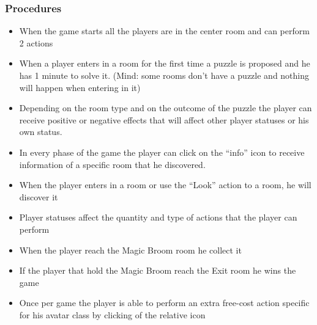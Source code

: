 \subsubsection{Procedures}
\begin{itemize}
\item When the game starts all the players are in the center room and can perform 2 actions
\item  When a player enters in a room for the first time a puzzle is proposed and he has 1 minute to solve it. (Mind: some rooms don’t have a puzzle and nothing will happen when entering in it)
\item  Depending on the room type and on the outcome of the puzzle the player can receive positive or negative effects that will affect other player statuses or his own status.
\item In every phase of the game the player can click on the “info” icon to receive information of a specific room that he discovered.
\item When the player enters in a room or use the “Look” action to a room, he will discover it
\item Player statuses affect the quantity and type of actions that the player can perform
\item When the player reach the Magic Broom room he collect it
\item If the player that hold the Magic Broom reach the Exit room he wins the game
\item Once per game the player is able to perform an extra free-cost action specific for his avatar class by clicking of the relative icon
\end{itemize}
